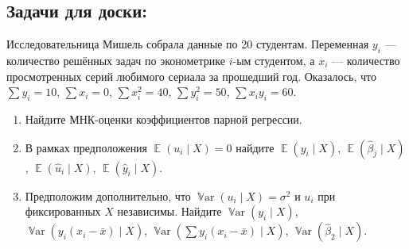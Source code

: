 \documentclass[12pt]{article}
\DeclareMathOperator{\Var}{\mathbb{V}ar}
\DeclareMathOperator{\E}{\mathbb{E}}
\newcommand{\hb}{\hat{\beta}}
\newenvironment{sol}{}{}
\begin{document}
\subsection{Задачи для доски:}





\begin{problem}
Исследовательница Мишель собрала данные по 20 студентам. 
Переменная $y_i$ — количество решённых задач по эконометрике $i$-ым студентом, 
а $x_i$ — количество просмотренных серий любимого сериала за прошедший год. 
Оказалось, что $\sum y_i = 10$, $\sum x_i = 0$, $\sum x_i^2 = 40$, $\sum y_i^2 = 50$, $\sum x_i y_i = 60$.

\begin{enumerate}
\item Найдите МНК-оценки коэффициентов парной регрессии.
\item В рамках предположения $\E(u_i \mid X) = 0$ найдите $\E(y_i \mid X)$, $\E(\hb_j \mid X)$, $\E(\hat u_i \mid X)$, $\E(\hat y_i \mid X)$.
\item Предположим дополнительно, что $\Var(u_i \mid X)=\sigma^2$ и $u_i$ при фиксированных $X$ независимы. 
Найдите $\Var(y_i \mid X)$, $\Var(y_i (x_i - \bar x) \mid X)$, $\Var(\sum y_i (x_i - \bar x) \mid X)$, $\Var(\hb_2 \mid X)$.
\end{enumerate}
\begin{sol}
  \end{sol}
\end{problem}
\end{document}
